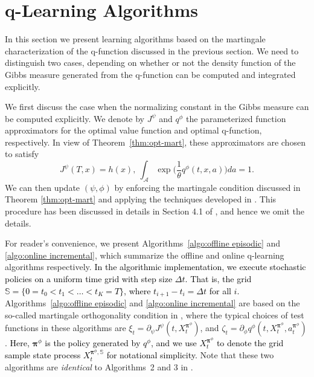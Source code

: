\documentclass[11pt]{article}
\newcommand{\bm}[1]{\boldsymbol{#1}}
\newcommand{\1}{\mathbbm{1}}
\newcommand{\bpi}{\boldsymbol{\pi}}
\newcommand{\rev}[1]{\textcolor{black}{{#1}}} %
\begin{document}
\section{q-Learning Algorithms}\label{sec:q-algo}

In this section we present learning algorithms based on the martingale characterization of the q-function discussed in the previous section. We need to distinguish  two cases, depending on whether or not the density function of the Gibbs measure generated from the q-function can be computed and integrated explicitly.

We first discuss the case when the normalizing constant in the Gibbs measure can be computed explicitly.
We denote by $J^{\psi}$ and ${q}^{\phi}$ the parameterized function approximators for the optimal value function and optimal q-function, respectively. In view of Theorem~\ref{thm:opt-mart}, these approximators are chosen to satisfy
\begin{equation}\label{ex:constraints qv optimal}
{J}^{\psi}(T,x) = h(x),\ \int_{\mathcal{A}} \exp\Big(  \frac{1}{\theta}q^{\phi}(t,x,a)\Big) d a = 1.
\end{equation}
We can then update $(\psi,\phi)$ by enforcing the martingale condition discussed in Theorem \ref{thm:opt-mart} and applying the techniques developed  in \cite{jia2022policy}. This procedure has been discussed in details in Section 4.1 of  \cite{jia2022q}, and hence we omit the details.

For reader's convenience, we present Algorithms~\ref{algo:offline episodic} and \ref{algo:online incremental}, which  summarize the offline and online q-learning algorithms respectively. \rev{In the algorithmic implementation, we execute stochastic policies on a uniform time grid with step size $\Delta t$. That is, the grid $\mathbb{S}= \{0= t_0 < t_1 < \ldots < t_K= T\}$, where $t_{i+1} - t_i = \Delta t$ for all $i$. }
Algorithms~\ref{algo:offline episodic} and \ref{algo:online incremental} are based on the so-called martingale orthogonality condition in \cite{jia2022policy}, where the typical choices of test functions in these algorithms are $\xi_t = \partial_{\psi} J^{\psi}(t,X_t^{\bm\pi^{\phi}})$, and $\zeta_t = \partial_{\phi} q^{\phi}(t,X_t^{\bm\pi^{\phi}},a_t^{\bm\pi^{\phi}})$. \rev{Here, $\bpi^{\phi}$ is the policy generated by $q^\phi$, and we use $X_t^{\bm\pi^{\phi}}$ to denote the grid sample state process $X_t^{\bm\pi^{\phi}, \mathbb{S}}$ for notational simplicity.}
Note that these two algorithms are {\it identical} to Algorithms~2 and 3 in \cite{jia2022q}.
\end{document}
